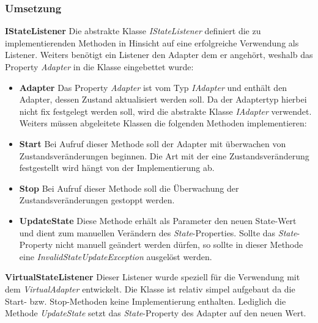 \subsubsection{Umsetzung}
\textbf{IStateListener}
\newline
Die abstrakte Klasse \textit{IStateListener} definiert die zu implementierenden Methoden in Hinsicht auf eine erfolgreiche Verwendung als Listener. Weiters benötigt ein Listener den Adapter dem er angehört, weshalb das Property \textit{Adapter} in die Klasse eingebettet wurde:
\begin{itemize}
\item \textbf{Adapter}
\newline
Das Property \textit{Adapter} ist vom Typ \textit{IAdapter} und enthält den Adapter, dessen Zustand aktualisiert werden soll. Da der Adaptertyp hierbei nicht fix festgelegt werden soll, wird die abstrakte Klasse \textit{IAdapter} verwendet. 
Weiters müssen abgeleitete Klassen die folgenden Methoden implementieren:
\item \textbf{Start}
\newline
Bei Aufruf dieser Methode soll der Adapter mit überwachen von Zustandsveränderungen beginnen. Die Art mit der eine Zustandsveränderung festgestellt wird hängt von der Implementierung ab.
\item \textbf{Stop}
\newline
Bei Aufruf dieser Methode soll die Überwachung der Zustandsveränderungen gestoppt werden.
\item \textbf{UpdateState}
\newline
Diese Methode erhält als Parameter den neuen State-Wert und dient zum manuellen Verändern des \textit{State}-Properties. Sollte das \textit{State}-Property nicht manuell geändert werden dürfen, so sollte in dieser Methode eine \textit{InvalidStateUpdateException} ausgelöst werden.
\end{itemize}

\textbf{VirtualStateListener}
\newline
Dieser Listener wurde speziell für die Verwendung mit dem \textit{VirtualAdapter} entwickelt. Die Klasse ist relativ simpel aufgebaut da die Start- bzw. Stop-Methoden keine Implementierung enthalten. Lediglich die Methode \textit{UpdateState} setzt das \textit{State}-Property des Adapter auf den neuen Wert.

